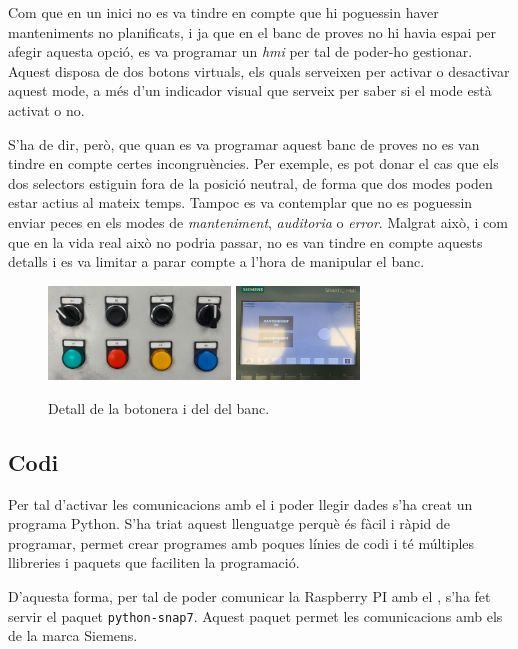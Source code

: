 \documentclass{tfgitic}[2022/06/30]
\begin{document}
Com que en un inici no es va tindre en compte que hi poguessin haver manteniments no planificats, i ja que en el banc de proves no hi havia espai per afegir aquesta opció, es va programar un \emph{hmi} per tal de poder-ho gestionar. Aquest disposa de dos botons virtuals, els quals serveixen per activar o desactivar aquest mode, a més d'un indicador visual que serveix per saber si el mode està activat o no.

S'ha de dir, però, que quan es va programar aquest banc de proves no es van tindre en compte certes incongruències. Per exemple, es pot donar el cas que els dos selectors estiguin fora de la posició neutral, de forma que dos modes poden estar actius al mateix temps. Tampoc es va contemplar que no es poguessin enviar peces en els modes de \emph{manteniment}, \emph{auditoria} o \emph{error}. Malgrat això, i com que en la vida real això no podria passar, no es van tindre en compte aquests detalls i es va limitar a parar compte a l'hora de manipular el banc.

\begin{figure}[h]
\centering
\includegraphics[height=2.5cm]{img/botonera.jpg}
\includegraphics[height=2.5cm]{img/hmi.jpg}
\caption{Detall de la botonera i del  del banc.}
\label{s71200}
\end{figure}

\subsection{Codi}
\label{section: raspicom_codi}
Per tal d'activar les comunicacions amb el  i poder llegir dades s'ha creat un programa Python. S'ha triat aquest llenguatge perquè és fàcil i ràpid de programar, permet crear programes amb poques línies de codi i té múltiples llibreries i paquets que faciliten la programació.

D'aquesta forma, per tal de poder comunicar la Raspberry PI amb el , s'ha fet servir el paquet \texttt{python-snap7}. Aquest paquet permet les comunicacions amb els  de la marca Siemens.
\end{document}
